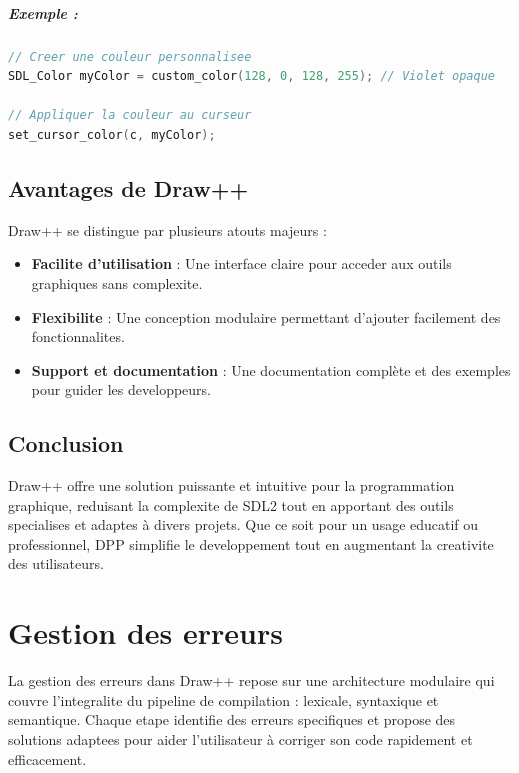 \documentclass[12pt,a4paper]{report}
\begin{document}
\paragraph{Exemple :}
\begin{lstlisting}[language=C]
// Creer une couleur personnalisee
SDL_Color myColor = custom_color(128, 0, 128, 255); // Violet opaque

// Appliquer la couleur au curseur
set_cursor_color(c, myColor);
\end{lstlisting}

\section{Avantages de Draw++}
Draw++ se distingue par plusieurs atouts majeurs :

\begin{itemize}
    \item \textbf{Facilite d'utilisation} : Une interface claire pour acceder aux outils graphiques sans complexite.
    \item \textbf{Flexibilite} : Une conception modulaire permettant d'ajouter facilement des fonctionnalites.
    \item \textbf{Support et documentation} : Une documentation complète et des exemples pour guider les developpeurs.
\end{itemize}

\section{Conclusion}
Draw++ offre une solution puissante et intuitive pour la programmation graphique, reduisant la complexite de SDL2 tout en apportant des outils specialises et adaptes à divers projets. Que ce soit pour un usage educatif ou professionnel, DPP simplifie le developpement tout en augmentant la creativite des utilisateurs.





\chapter{Gestion des erreurs}

La gestion des erreurs dans Draw++ repose sur une architecture modulaire qui couvre l'integralite du pipeline de compilation : lexicale, syntaxique et semantique. Chaque etape identifie des erreurs specifiques et propose des solutions adaptees pour aider l'utilisateur à corriger son code rapidement et efficacement.
\end{document}
